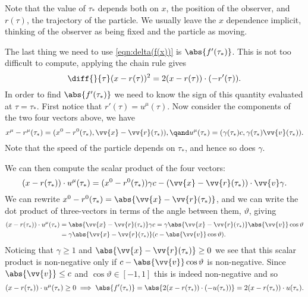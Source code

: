 \documentclass[fleqn]{NotesClass}
\begin{document}
    Note that the value of \(\tau_*\) depends both on \(x\), the position of the observer, and \(r(\tau)\), the trajectory of the particle.
    We usually leave the \(x\) dependence implicit, thinking of the observer as being fixed and the particle as moving.
    
    The last thing we need to use \cref{eqn:delta(f(x))} is \(\abs{f'(\tau_*)}\).
    This is not too difficult to compute, applying the chain rule gives
    \begin{equation}
        \diff{}{\tau} (x - r(\tau))^2 = 2(x - r(\tau)) \cdot (-r'(\tau)).
    \end{equation}
    In order to find \(\abs{f'(\tau_*)}\) we need to know the sign of this quantity evaluated at \(\tau = \tau_*\).
    First notice that \(r'(\tau) = u^\mu(\tau)\).
    Now consider the components of the two four vectors above, we have
    \begin{equation}
        x^\mu - r^\mu(\tau_*) = (x^0 - r^0(\tau_*), \vv{x} - \vv{r}(\tau_*)), \qand u^\mu(\tau_*) = (\gamma(\tau_*)c, \gamma(\tau_*)\vv{v}(\tau_*)).
    \end{equation}
    Note that the speed of the particle depends on \(\tau_*\), and hence so does \(\gamma\).
    
    We can then compute the scalar product of the four vectors:
    \begin{equation}
        (x - r(\tau_*)) \cdot u^\mu(\tau_*) = (x^0 - r^0(\tau_*)) \gamma c - (\vv{x} - \vv{r}(\tau_*)) \cdot \vv{v} \gamma.
    \end{equation}
    We can rewrite \(x^0 - r^0(\tau_*) = \abs{\vv{x} - \vv{r}(\tau_*)}\), and we can write the dot product of three-vectors in terms of the angle between them, \(\vartheta\), giving
    \begin{align}
        (x - r(\tau_*)) \cdot u^\mu(\tau_*) &= \abs{\vv{x} - \vv{r}(\tau_*)}\gamma c = \gamma\abs{\vv{x} - \vv{r}(\tau_*)}\abs{\vv{v}} \cos\vartheta\\
        &= \gamma \abs{\vv{x} - \vv{r}(\tau_*)} (c - \abs{\vv{v}} \cos\vartheta).
    \end{align}
    Noticing that \(\gamma \ge 1\) and \(\abs{\vv{x} - \vv{r}(\tau_*)} \ge 0\) we see that this scalar product is non-negative only if \(c - \abs{\vv{v}}\cos\vartheta\) is non-negative.
    Since \(\abs{\vv{v}} \le c\) and \(\cos\vartheta \in [-1, 1]\) this is indeed non-negative and so
    \begin{equation}
        (x - r(\tau_*)) \cdot u^\mu(\tau_*) \ge 0 \implies \abs{f'(\tau_*)} = \abs{2(x - r(\tau_*)) \cdot (-u(\tau_*))} = 2(x - r(\tau_*))\cdot u(\tau_*).
    \end{equation}
    
\end{document}

